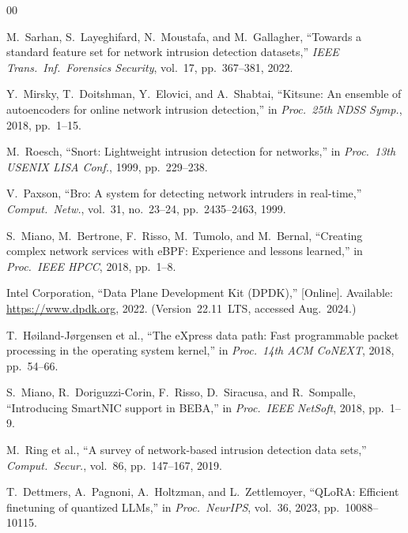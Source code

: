 \documentclass[journal]{IEEEtran}
\renewcommand{\_}{\textunderscore\allowbreak}
\begin{document}
\begin{thebibliography}{00}

M.~Sarhan, S.~Layeghifard, N.~Moustafa, and M.~Gallagher, ``Towards a standard
feature set for network intrusion detection datasets,''
\emph{IEEE Trans.\ Inf.\ Forensics Security}, vol.~17, pp.~367--381, 2022.

Y.~Mirsky, T.~Doitshman, Y.~Elovici, and A.~Shabtai, ``Kitsune: An ensemble of
autoencoders for online network intrusion detection,''
in \emph{Proc.\ 25th NDSS Symp.}, 2018, pp.~1--15.

M.~Roesch, ``Snort: Lightweight intrusion detection for networks,''
in \emph{Proc.\ 13th USENIX LISA Conf.}, 1999, pp.~229--238.

V.~Paxson, ``Bro: A system for detecting network intruders in real-time,''
\emph{Comput.\ Netw.}, vol.~31, no.~23--24, pp.~2435--2463, 1999.

S.~Miano, M.~Bertrone, F.~Risso, M.~Tumolo, and M.~Bernal, ``Creating complex
network services with eBPF: Experience and lessons learned,''
in \emph{Proc.\ IEEE HPCC}, 2018, pp.~1--8.

Intel Corporation, ``Data Plane Development Kit (DPDK),''
[Online]. Available: \url{https://www.dpdk.org}, 2022.
(Version~22.11~LTS, accessed Aug.~2024.)

T.~H{\o}iland-J{\o}rgensen et al., ``The eXpress data path: Fast programmable
packet processing in the operating system kernel,''
in \emph{Proc.\ 14th ACM CoNEXT}, 2018, pp.~54--66.

S.~Miano, R.~Doriguzzi-Corin, F.~Risso, D.~Siracusa, and R.~Sompalle,
``Introducing SmartNIC support in BEBA,''
in \emph{Proc.\ IEEE NetSoft}, 2018, pp.~1--9.

M.~Ring et al., ``A survey of network-based intrusion detection data sets,''
\emph{Comput.\ Secur.}, vol.~86, pp.~147--167, 2019.

T.~Dettmers, A.~Pagnoni, A.~Holtzman, and L.~Zettlemoyer, ``QLoRA: Efficient
finetuning of quantized LLMs,''
in \emph{Proc.\ NeurIPS}, vol.~36, 2023, pp.~10088--10115.


\end{thebibliography}
\end{document}
